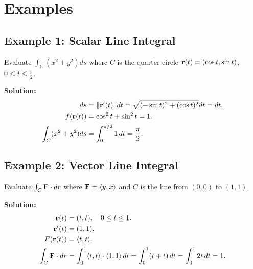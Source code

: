 \section{Examples}
\subsection{Example 1: Scalar Line Integral}
Evaluate \( \int_C (x^2 + y^2) ds \) where \( C \) is the quarter-circle \( \mathbf{r}(t) = (\cos t, \sin t) \), \( 0 \leq t \leq \frac{\pi}{2} \).

\textbf{Solution:}
\begin{align*}
    ds &= \|\mathbf{r}'(t)\| dt = \sqrt{(-\sin t)^2 + (\cos t)^2} dt = dt. \\
    f(\mathbf{r}(t)) &= \cos^2 t + \sin^2 t = 1. \\
    \int_C (x^2 + y^2) ds &= \int_0^{\pi/2} 1 \, dt = \frac{\pi}{2}.
\end{align*}

\subsection{Example 2: Vector Line Integral}
Evaluate \( \int_C \mathbf{F} \cdot dr \) where \( \mathbf{F} = \langle y, x \rangle \) and \( C \) is the line from \( (0,0) \) to \( (1,1) \).

\textbf{Solution:}
\begin{align*}
    \mathbf{r}(t) &= (t, t), \quad 0 \leq t \leq 1. \\
    \mathbf{r}'(t) &= (1,1). \\
    F(\mathbf{r}(t)) &= \langle t, t \rangle. \\
    \int_C \mathbf{F} \cdot dr &= \int_0^1 \langle t, t \rangle \cdot \langle 1, 1 \rangle \, dt = \int_0^1 (t + t) \, dt = \int_0^1 2t \, dt = 1.
\end{align*}